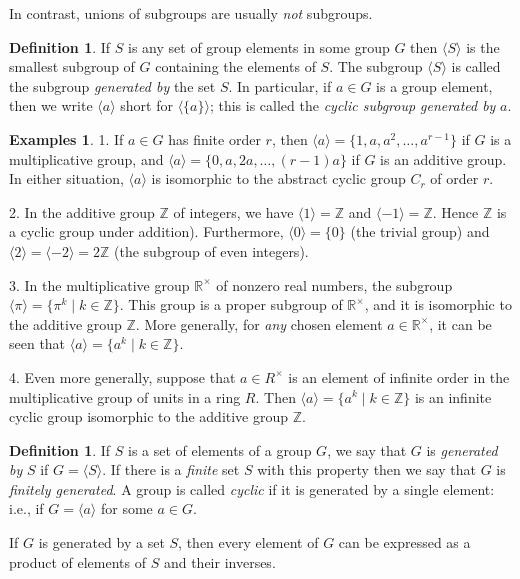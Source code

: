 \documentclass[11pt]{article}
\theoremstyle{definition}
\newtheorem{defn}[thm]{Definition}
\newtheorem{examples}[thm]{Examples}
\newcommand{\R}{\mathbb{R}} %
\newcommand{\Z}{\mathbb{Z}} %
\newcommand{\gen}[1]{\langle #1 \rangle}
\begin{document}
In contrast, unions of subgroups are usually \emph{not} subgroups.


\begin{defn}
  If $S$ is any set of group elements in some group $G$ then $\gen{S}$
  is the smallest subgroup of $G$ containing the elements of $S$. The
  subgroup $\gen{S}$ is called the subgroup \emph{generated by} the
  set $S$. In particular, if $a \in G$ is a group element, then we
  write $\gen{a}$ short for $\gen{\{a\}}$; this is called the
  \emph{cyclic subgroup generated by} $a$.
\end{defn}

\begin{examples}
1. If $a \in G$ has finite order $r$, then $\gen{a} = \{ 1, a, a^2,
\dots, a^{r-1} \}$ if $G$ is a multiplicative group, and $\gen{a} = \{
0, a, 2a, \dots, (r-1)a \}$ if $G$ is an additive group. In either
situation, $\gen{a}$ is isomorphic to the abstract cyclic group $C_r$
of order $r$.

2. In the additive group $\Z$ of integers, we have $\gen{1} = \Z$ and
$\gen{-1} = \Z$. Hence $\Z$ is a cyclic group under
addition). Furthermore, $\gen{0} = \{0\}$ (the trivial group) and
$\gen{2} = \gen{-2} = 2\Z$ (the subgroup of even integers).

3. In the multiplicative group $\R^\times$ of nonzero real numbers,
the subgroup $\gen{\pi} = \{ \pi^k \mid k \in \Z \}$. This group is a
proper subgroup of $\R^\times$, and it is isomorphic to the additive
group $\Z$. More generally, for \emph{any} chosen element $a \in
\R^\times$, it can be seen that $\gen{a} = \{ a^k \mid k \in \Z \}$.

4. Even more generally, suppose that $a \in R^\times$ is an element of
infinite order in the multiplicative group of units in a ring
$R$. Then $\gen{a} = \{ a^k \mid k \in \Z \}$ is an infinite cyclic
group isomorphic to the additive group $\Z$.
\end{examples}


\begin{defn}
  If $S$ is a set of elements of a group $G$, we say that $G$ is
  \emph{generated by} $S$ if $G = \gen{S}$. If there is a
  \emph{finite} set $S$ with this property then we say that $G$ is
  \emph{finitely generated}. A group is called \emph{cyclic} if it is
  generated by a single element: i.e., if $G = \gen{a}$ for some $a
  \in G$.
\end{defn}

If $G$ is generated by a set $S$, then every element of $G$ can be
expressed as a product of elements of $S$ and their inverses.
\end{document}
